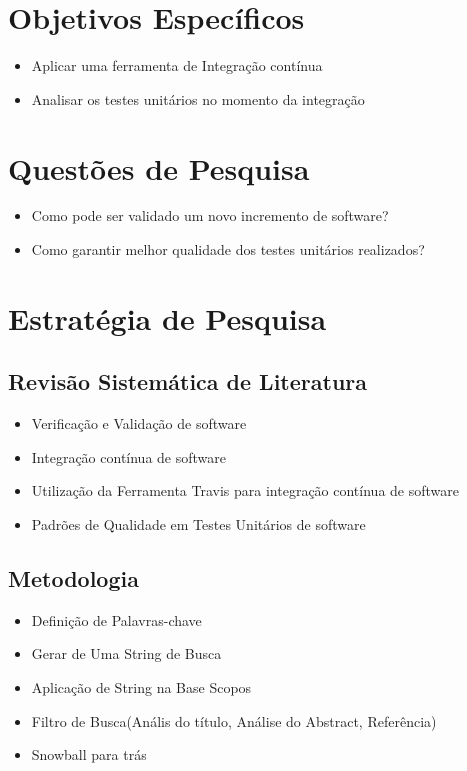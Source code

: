 \section{Objetivos Específicos }
\begin{itemize}
    \item Aplicar uma ferramenta de Integração contínua
    \item Analisar os testes unitários no momento da integração
\end{itemize}
\section{Questões de Pesquisa}
\begin{itemize}
    \item Como pode ser validado um novo incremento de software?
    \item Como garantir melhor qualidade dos testes unitários realizados?
\end{itemize}
\section{Estratégia de Pesquisa}
\subsection{Revisão Sistemática de Literatura}
\begin{itemize}
    \item Verificação e Validação de software
    \item Integração contínua de software
    \item  Utilização da Ferramenta Travis para integração contínua de software
    \item Padrões de Qualidade em Testes Unitários de software
\end{itemize}

\subsection{Metodologia}
\begin{itemize}
    \item Definição de Palavras-chave
    \item Gerar de Uma String de Busca
    \item Aplicação de String na Base Scopos
    \item Filtro de Busca(Anális do título, Análise do Abstract, Referência)
    \item Snowball para trás
\end{itemize}

